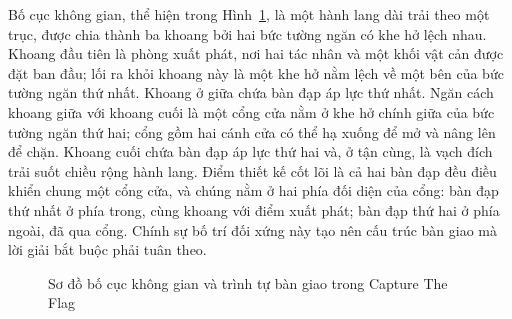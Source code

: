 \indent Bố cục không gian, thể hiện trong Hình~\ref{fig:puzzle_layout}, là một hành
lang dài trải theo một trục, được chia thành ba khoang bởi hai bức tường ngăn có khe hở
lệch nhau. Khoang đầu tiên là phòng xuất phát, nơi hai tác nhân và một khối vật cản
được đặt ban đầu; lối ra khỏi khoang này là một khe hở nằm lệch về một bên của bức
tường ngăn thứ nhất. Khoang ở giữa chứa bàn đạp áp lực thứ nhất. Ngăn cách khoang giữa
với khoang cuối là một cổng cửa nằm ở khe hở chính giữa của bức tường
ngăn thứ hai; cổng gồm hai cánh cửa có thể hạ xuống để mở và nâng lên để chặn. Khoang
cuối chứa bàn đạp áp lực thứ hai và, ở tận cùng, là vạch đích trải suốt chiều rộng
hành lang. Điểm thiết kế cốt lõi là cả hai bàn đạp đều điều khiển chung một cổng
cửa, và chúng nằm ở hai phía đối diện của cổng: bàn đạp thứ nhất ở phía trong, cùng
khoang với điểm xuất phát; bàn đạp thứ hai ở phía ngoài, đã qua cổng. Chính sự bố trí
đối xứng này tạo nên cấu trúc bàn giao mà lời giải bắt buộc phải tuân theo.

\begin{figure}[H]
\centering
{}
\caption{Sơ đồ bố cục không gian và trình tự bàn giao trong Capture The Flag}
\label{fig:puzzle_layout}
\end{figure}

